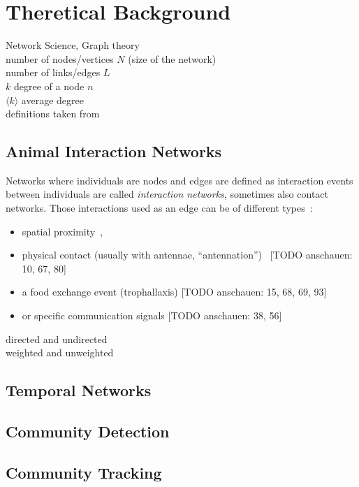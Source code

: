 \chapter{Theretical Background}
Network Science, Graph theory\\
number of nodes/vertices $N$ (size of the network)\\
number of links/edges $L$\\
$k$ degree of a node $n$\\
$ \langle k  \rangle$ average degree\\
definitions taken from~\textcite{barabasi2016network}\\

\section{Animal Interaction Networks}

Networks where individuals are nodes and edges are defined as interaction events between individuals are called \emph{interaction networks}, sometimes also contact networks. 
Those interactions used as an edge can be of different types~\cite{charbonneau2013social}:

\begin{itemize}
\item spatial proximity~\cite{jeanson2012long, otterstatter2007contact},
\item physical contact (usually with antennae, “antennation”)~\cite{mersch2013tracking} [TODO anschauen: 10, 67, 80]
\item a food exchange event (trophallaxis) [TODO anschauen: 15, 68, 69, 93]
\item or specific communication signals [TODO anschauen: 38, 56]
\end{itemize}

directed and undirected\\
weighted and unweighted\\

\section{Temporal Networks}

\section{Community Detection}

\section{Community Tracking}